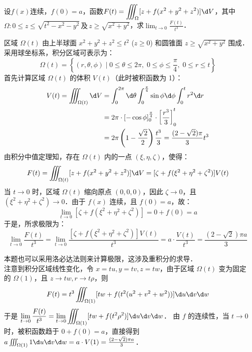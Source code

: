 \documentclass[12pt, a4paper, oneside, UTF8]{ctexbook}
\begin{document}
\begin{exercise}
    设$f(x)$连续，$f(0)=a$，函数$F(t)=\displaystyle\iiint_\Omega [z+f(x^2+y^2+z^2)] \d V$，其中$\Omega :0\le z\le\sqrt{t^2-x^2-y^2}\,\text{及}\,z\ge\sqrt{x^2+y^2}$，求$\displaystyle\lim_{t\to 0}\frac{F(t)}{t^3}$．
\end{exercise}
\begin{solution}
区域 $\Omega(t)$ 由上半球面 $x^2+y^2+z^2 \le t^2$ ($z \ge 0$) 和圆锥面 $z \ge \sqrt{x^2+y^2}$ 围成．
采用球坐标系，积分区域可表示为：
\[ \Omega(t) = \left\{ (r, \theta, \phi) \;\bigg|\; 0 \le \theta \le 2\pi, \; 0 \le \phi \le \frac{\pi}{4}, \; 0 \le r \le t \right\} \]
首先计算区域 $\Omega(t)$ 的体积 $V(t)$（此时被积函数为 1）：
\begin{align*}
V(t) = \iiint_{\Omega(t)} \d V &= \int_0^{2\pi} \d\theta \int_0^{\frac{\pi}{4}} \sin\phi \d\phi \int_0^t r^2 \d r \\
&= 2\pi \cdot \left[ -\cos\phi \right]_0^{\frac{\pi}{4}} \cdot \left[ \frac{r^3}{3} \right]_0^t \\
&= 2\pi \left( 1 - \frac{\sqrt{2}}{2} \right) \frac{t^3}{3} = \frac{(2-\sqrt{2})\pi}{3} t^3
\end{align*}
由积分中值定理知，存在 $\Omega(t)$ 内的一点 $(\xi, \eta, \zeta)$，使得：
\[ F(t) = \iiint_{\Omega(t)} [z+f(x^2+y^2+z^2)] \d V = [\zeta + f(\xi^2+\eta^2+\zeta^2)] V(t) \]
当 $t \to 0$ 时，区域 $\Omega(t)$ 缩向原点 $(0,0,0)$，因此 $\zeta \to 0$，且 $(\xi^2+\eta^2+\zeta^2) \to 0$．由于 $f(x)$ 连续，且 $f(0)=a$，故：
\[ \lim_{t\to 0} [\zeta + f(\xi^2+\eta^2+\zeta^2)] = 0 + f(0) = a \]
于是，所求极限为：
\[ \lim_{t\to 0} \frac{F(t)}{t^3} = \lim_{t\to 0} \frac{[\zeta + f(\xi^2+\eta^2+\zeta^2)] V(t)}{t^3} = a \cdot \frac{V(t)}{t^3} = \boxed{\frac{(2-\sqrt{2})\pi a}{3}} \]
\end{solution}
\begin{myRemark}
    本题也可以采用洛必达法则来计算极限，这涉及重积分的求导．\\
    注意到积分区域线性变化，令 $x=tu, y=tv, z=tw$，由于区域 $\Omega(t)$ 变为固定的 $\Omega(1)$，且 $z \to tw, r \to t\rho$，则
    \[ F(t) = t^3 \iiint_{\Omega(1)} [tw + f(t^2(u^2+v^2+w^2))] \d u\d v\d w \]
    于是 $\displaystyle \lim_{t\to 0} \frac{F(t)}{t^3} = \lim_{t\to 0} \iiint_{\Omega(1)} [tw + f(t^2\rho^2)] \d u\d v\d w$．
    由 $f$ 的连续性，当 $t \to 0$ 时，被积函数趋于 $0 + f(0) = a$，直接得到 $a \iiint_{\Omega(1)} 1 \d u\d v\d w = a \cdot V(1) = \frac{(2-\sqrt{2})\pi a}{3}$．
\end{myRemark}
\end{document}
